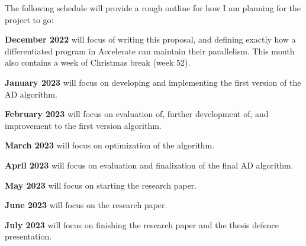 \documentclass{article}
\begin{document}
        The following schedule will provide a rough outline for how I am planning for the project to go:
        
        \textbf{December 2022} will focus of writing this proposal, and defining exactly how a differentiated program in Accelerate can maintain their parallelism. This month also contains a week of Christmas break (week 52).

        \textbf{January 2023} will focus on developing and implementing the first version of the AD algorithm.

        \textbf{February 2023} will focus on evaluation of, further development of, and improvement to the first version algorithm.
        
        \textbf{March 2023} will focus on optimization of the algorithm.

        \textbf{April 2023} will focus on evaluation and finalization of the final AD algorithm.
        
        \textbf{May 2023} will focus on starting the research paper.
        
        \textbf{June 2023} will focus on the research paper.
        
        \textbf{July 2023} will focus on finishing the research paper and the thesis defence presentation.

    \clearpage
    
    
\end{document}
